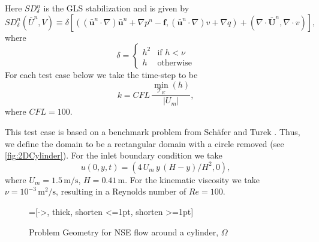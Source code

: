     Here $SD_{\delta}^n$ is the GLS stabilization and is given by
    \begin{equation}
        SD_{\delta}^n(\bar{U}^n, V) \equiv
        \delta \left[(\left(\bar{\mathbf{u}}^n \cdot \nabla \right) \bar{\mathbf{u}}^n
            + \nabla p^n - \mathbf{f},
        \left(\bar{\mathbf{u}}^n \cdot \nabla \right) v + \nabla q)
            + (\nabla \cdot \bar{\mathbf{U}}^n, \nabla \cdot v)\right],
    \label{eqn:NSEStabilization}
    \end{equation}
    where
    \begin{equation*}
        \delta = \begin{cases}
            h^2 & \text{if } h < \nu \\
            h & \text{otherwise}
        \end{cases}
    \end{equation*}
    For each test case below we take the time-step to be
    \begin{equation*}
    k = CFL\, \frac{\min_{\mathcal{T}_K}(h)}{|U_m|},
    \end{equation*}
    where $CFL=100$.

    This test case is based on a benchmark problem from Sch\"afer and Turek
    \cite[Test case 2D-2]{Schaefer1996}. Thus, we define the domain to be a
    rectangular domain with a circle removed (see \autoref{fig:2DCylinder}). For
    the inlet boundary condition we take
    \begin{equation}
        u(0,y,t) = (4\, U_m\,y\, (H - y)/H^2, 0),
        \label{eqn:2DInlet}
    \end{equation}
    where $U_m = 1.5\, \text{m/s}$, $H = 0.41\, \text{m}$. For the kinematic
    viscosity we take $\nu = 10^{-3}\, \text{m}^2\text{/s}$, resulting in a
    Reynolds number of $Re=100$.

    \begin{figure}[h]
        \centering
        =[->, thick, shorten <=1pt, shorten >=1pt]
        \caption{Problem Geometry for NSE flow around a cylinder, $\Omega$}
        \label{fig:2DCylinder}
    \end{figure}

